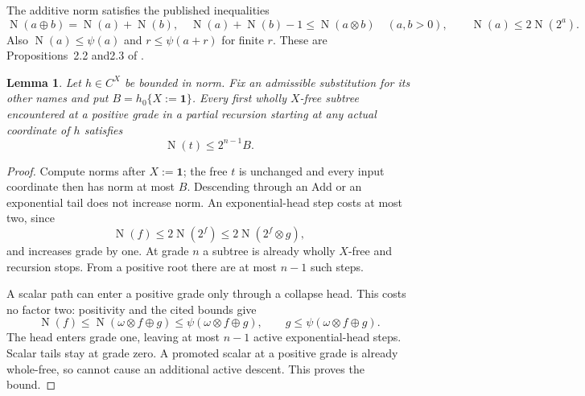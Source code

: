 \documentclass[11pt]{article}
\newtheorem{lemma}[theorem]{Lemma}
\newcommand{\norm}{\operatorname{N}}
\newcommand{\one}{\mathbf1}
\begin{document}
The additive norm satisfies the published inequalities
\[
 \norm(a\oplus b)=\norm(a)+\norm(b),\quad
 \norm(a)+\norm(b)-1\le\norm(a\otimes b)\quad(a,b>0),
 \qquad \norm(a)\le2\norm(2^a).
\]
Also $\norm(a)\le\psi(a)$ and $r\le\psi(a+r)$ for finite $r$.
These are Propositions~2.2 and2.3 of \cite{WW}.

\begin{lemma}\label{lem:free}
Let $h\in C^X$ be bounded in norm. Fix an admissible substitution for its other
names and put $B=h_0\{X:=\one\}$. Every first wholly $X$-free
subtree encountered at a positive grade in a partial recursion starting
at any actual coordinate of $h$ satisfies
\[
 \norm(t)\le2^{n-1}B.
\]
\end{lemma}
\begin{proof}
Compute norms after $X:=\one$; the free $t$ is unchanged and every
input coordinate then has norm at most $B$. Descending through an Add
or an exponential tail does not increase norm. An exponential-head
step costs at most two, since
\[
 \norm(f)\le2\norm(2^f)\le2\norm(2^f\otimes g),
\]
and increases grade by one. At grade $n$ a subtree is already wholly
$X$-free and recursion stops. From a positive root there are at most
$n-1$ such steps.

A scalar path can enter a positive grade only through a collapse head.
This costs no factor two: positivity and the cited bounds give
\[
 \norm(f)\le\norm(\omega\otimes f\oplus g)
                  \le\psi(\omega\otimes f\oplus g),\qquad
 g\le\psi(\omega\otimes f\oplus g).
\]
The head enters grade one, leaving at most $n-1$ active
exponential-head steps. Scalar tails stay at grade zero. A promoted
scalar at a positive grade is already whole-free, so cannot cause an
additional active descent. This proves the bound.
\end{proof}
\end{document}
